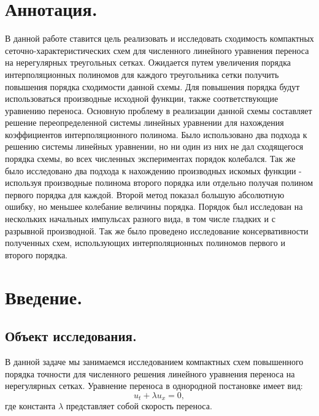 \documentclass[14pt]{article}
\begin{document}
\section*{Аннотация.}
В данной работе ставится цель реализовать и исследовать сходимость компактных сеточно-характеристических схем для численного линейного уравнения переноса на нерегулярных треугольных сетках. Ожидается путем увеличения порядка интерполяционных полиномов для каждого треугольника сетки получить повышения порядка сходимости данной схемы. Для повышения порядка будут использоваться производные исходной функции, также соответствующие уравнению переноса. Основную проблему в реализации данной схемы составляет решение переопределенной системы линейных уравнении для нахождения коэффициентов интерполяционного полинома.
Было использовано два подхода к решению системы линейных уравнении, но ни один из них не дал сходящегося порядка схемы, во всех численных экспериментах порядок колебался. Так же было исследовано два подхода к нахождению производных искомых функции - используя производные полинома второго порядка или отдельно получая полином первого порядка для каждой. Второй метод показал большую абсолютную ошибку, но меньшее колебание величины порядка. Порядок был исследован на нескольких начальных импульсах разного вида, в том числе гладких и с разрывной производной. Так же было проведено исследование консервативности полученных схем, использующих интерполяционных полиномов первого и второго порядка. %
\newpage
\tableofcontents



\newpage
\section*{Введение.}


\subsection*{Объект исследования.}
В данной задаче мы занимаемся исследованием компактных схем повышенного порядка точности для численного решения линейного уравнения переноса на нерегулярных сетках. Уравнение переноса в однородной постановке имеет вид:
\begin{equation}
u_{t} + \lambda u_{x} = 0,
\label{formula1}
\end{equation} 
где константа $\lambda$ представляет собой скорость переноса.
\end{document}
